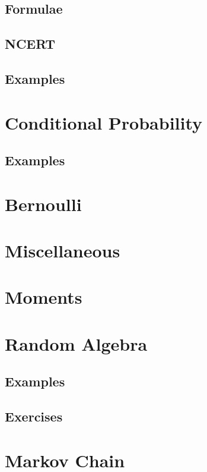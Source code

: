 \documentclass[journal]{IEEEtran}
\begin{document}
\subsection{Formulae}
\subsection{NCERT}

\subsection{Examples}

\section{Conditional Probability}
\subsection{Examples}

\section{Bernoulli}


    \section{Miscellaneous}

\iffalse
\section{Moments}

\section{Random Algebra}
\subsection{Examples}

\subsection{Exercises}

\section{Markov Chain}

\end{document}
